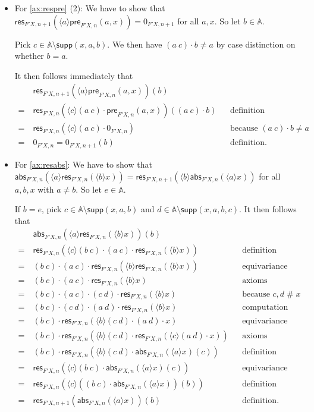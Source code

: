 \documentclass[11pt,a4paper]{amsart}
\newcommand{\pre}{\mathsf{pre}}
\newcommand{\abs}{\mathsf{abs}}
\newcommand{\res}{\mathsf{res}}
\newcommand{\Names}{\mathbb{A}}
\newcommand{\fresh}{\mathbin{\#}}
\newcommand{\supp}{\mathsf{supp}}
\newcommand{\bind}[1]{\langle #1\rangle}
\theoremstyle{plain}
\numberwithin{equation}{section}
\newcommand{\+}[1]{\mathcal{#1}\xspace}
\theoremstyle{definition}
\begin{document}
\begin{itemize}
  \item For \eqref{ax:respre} (2):
    We have to show that \(\res_{F'X,n+1}(\bind{a} \pre_{F'X,n}(a,x)) = 0_{F'X,n+1}\) for all \(a,x\).
    So let \(b \in \Names\).

    Pick \(c \in \Names \setminus \supp(x, a, b)\).
    We then have \((a\ c) \cdot b \neq a\) by case distinction on whether \(b = a\).

    It then follows immediately that
    \begin{align*}
      &\res_{F'X,n+1}(\bind{a} \pre_{F'X,n}(a,x))(b) \\
      =~&\res_{F'X,n}(\bind{c} (a\ c) \cdot \pre_{F'X,n}(a,x))((a\ c) \cdot b) && \text{definition} \\
      =~&\res_{F'X,n}(\bind{c} (a\ c) \cdot 0_{F'X,n}) && \text{because } (a\ c) \cdot b \neq a \\
      =~&0_{F'X,n} = 0_{F'X,n+1}(b) && \text{definition}.
    \end{align*}
  \item For \eqref{ax:resabs}:
    We have to show that \(\abs_{F'X,n}(\bind{a} \res_{F'X, n}(\bind{b} x)) = \res_{F'X, n+1}(\bind{b} \abs_{F'X,n}(\bind{a} x))\) for all \(a,b,x\) with \(a \neq b\).
    So let \(e \in \Names\).

    If \(b = e\), pick \(c \in \Names \setminus \supp(x,a,b)\) and \(d \in \Names \setminus \supp(x,a,b,c)\).
    It then follows that
    \begin{align*}
      &\abs_{F'X,n}(\bind{a} \res_{F'X, n}(\bind{b} x))(b) \\
      =~&\res_{F'X, n}(\bind{c} (b\ c) \cdot (a\ c) \cdot \res_{F'X,n}(\bind{b} x)) && \text{definition} \\
      =~&(b\ c) \cdot (a\ c) \cdot \res_{F'X,n}(\bind{b} \res_{F'X,n}(\bind{b} x)) && \text{equivariance} \\
      =~&(b\ c) \cdot (a\ c) \cdot \res_{F'X,n}(\bind{b} x) && \text{axioms} \\
      =~&(b\ c) \cdot (a\ c) \cdot (c\ d) \cdot \res_{F'X,n}(\bind{b} x) && \text{because } c,d\fresh x \\
      =~&(b\ c) \cdot (c\ d) \cdot (a\ d) \cdot \res_{F'X,n}(\bind{b} x) && \text{computation} \\
      =~&(b\ c) \cdot \res_{F'X,n}(\bind{b} (c\ d) \cdot (a\ d) \cdot x) && \text{equivariance} \\
      =~&(b\ c) \cdot \res_{F'X,n}(\bind{b} (c\ d) \cdot \res_{F'X,n}(\bind{c} (a\ d) \cdot x)) && \text{axioms} \\
      =~&(b\ c) \cdot \res_{F'X,n}(\bind{b} (c\ d) \cdot \abs_{F'X,n}(\bind{a} x)(c)) && \text{definition} \\
      =~&\res_{F'X, n}(\bind{c} (b\ c) \cdot \abs_{F'X,n}(\bind{a} x)(c)) && \text{equivariance} \\
      =~&\res_{F'X, n}(\bind{c} ((b\ c) \cdot \abs_{F'X,n}(\bind{a} x))(b)) && \text{definition} \\
      =~&\res_{F'X,n+1}(\abs_{F'X,n}(\bind{a} x))(b) && \text{definition}.
    \end{align*}


\end{itemize}
\end{document}
